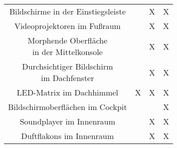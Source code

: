 \begin{table}[hbt]
\begin{tabular}{c|ccc}
		\parbox[t]{0.4\linewidth}{\centering Bildschirme in der Einstiegsleiste} &  & X & X \\
		\parbox[t]{0.4\linewidth}{\centering Videoprojektoren im Fußraum} &  & X & X \\
		\parbox[t]{0.4\linewidth}{\centering Morphende Oberfläche\\in der Mittelkonsole} &  & X & X \\
		\parbox[t]{0.4\linewidth}{\centering Durchsichtiger Bildschirm\\im Dachfenster} &  & X & X \\
		LED-Matrix im Dachhimmel & X & X & X \\
		\parbox[t]{0.4\linewidth}{\centering Bildschirmoberflächen im Cockpit} &  &  & X \\
		\parbox[t]{0.4\linewidth}{\centering Soundplayer im Innenraum} &  & X & X \\
		\parbox[t]{0.4\linewidth}{\centering Duftflakons im Innenraum} &  & X & X \\
	\end{tabular} 
\end{table}

